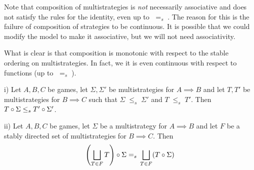 \documentclass{entcs} \usepackage{prentcsmacro}
\newcommand{\stle}{{\;\le_s\;}}
\newcommand{\steq}{{\;=_s\;}}
\newcommand{\exlub}{\bigsqcup}
\newcommand{\0}{{\mathtt{0}}}
\newcommand{\Tau}{T}
\begin{document}
Note that composition of multistrategies is \emph{not} necessarily associative and does not satisfy the rules for the identity, even up to $\steq$.  The reason for this is the failure of composition of strategies to be continuous.  It is possible that we could modify the model to make it associative, but we will not need associativity.

What is clear is that composition is monotonic with respect to the stable ordering on multistrategies.  In fact, we it is even continuous with respect to functions (up to $\steq$).

\begin{proposition}
  \label{RareContinuityResult}
  i) Let $A,B,C$ be games, let $\Sigma,\Sigma'$ be multistrategies for $A\implies B$ and let $\Tau,\Tau'$ be multistrategies for $B\implies C$ such that $\Sigma\stle\Sigma'$ and $\Tau\stle\Tau'$.  Then $\icomp\Tau\Sigma\stle\icomp{\Tau'}{\Sigma'}$.  

  ii) Let $A,B,C$ be games, let $\Sigma$ be a multistrategy for $A\implies B$ and let $F$ be a stably directed set of multistrategies for $B\implies C$.  Then
      \[
        \icomp{\left(\exlub_{\Tau\in F}\Tau\right)}\Sigma \steq \exlub_{\Tau\in F}(\icomp\Tau\Sigma)
        \]
\end{proposition}
\end{document}
